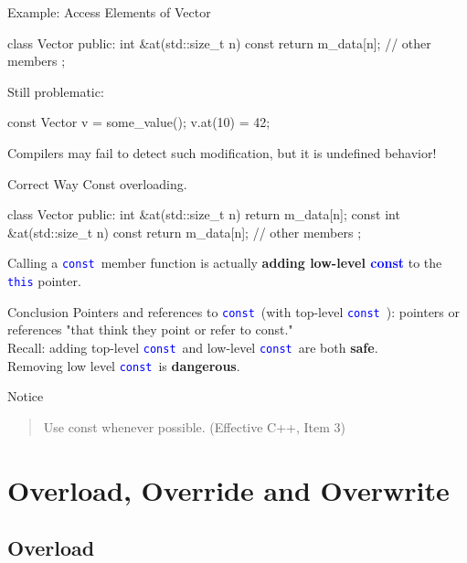 \documentclass{beamer}
\newcommand{\blue}[1]{\textcolor{blue}{#1}}
\renewcommand{\bf}[1]{\textbf{#1}}
\newcommand{\ttt}[1]{\texttt{#1}}
\newcommand{\bluett}[1]{\blue{\ttt{#1}}}
\newcommand{\const}{\bluett{const}~}
\begin{document}
\begin{frame}[fragile]{Example: Access Elements of Vector}
    \begin{cpp}
class Vector {
 public:
  int &at(std::size_t n) const {
    return m_data[n];
  }
  // other members
};
    \end{cpp}
    Still problematic:
    \begin{cpp}
const Vector v = some_value();
v.at(10) = 42;
    \end{cpp}
    Compilers may fail to detect such modification, but it is undefined behavior!
\end{frame}

\begin{frame}[fragile]{Correct Way}
    Const overloading.
    \begin{cpp}
class Vector {
 public:
  int &at(std::size_t n) {
    return m_data[n];
  }
  const int &at(std::size_t n) const {
    return m_data[n];
  }
  // other members
};
    \end{cpp}
    Calling a \const member function is actually \textbf{adding low-level \blue{const}} to the \bluett{this} pointer.
\end{frame}

\begin{frame}{Conclusion}
    Pointers and references to \const (with top-level \const): pointers or references "that think they point or refer to const."\\
    Recall: adding top-level \const and low-level \const are both \bf{safe}.\\
    Removing low level \const is \bf{dangerous}.
    \begin{alertblock}{Notice}
        \begin{quote}
            Use const whenever possible. (Effective C++, Item 3)
        \end{quote}
    \end{alertblock}
\end{frame}

\section{Overload, Override and Overwrite}

\subsection{Overload}
\end{document}
